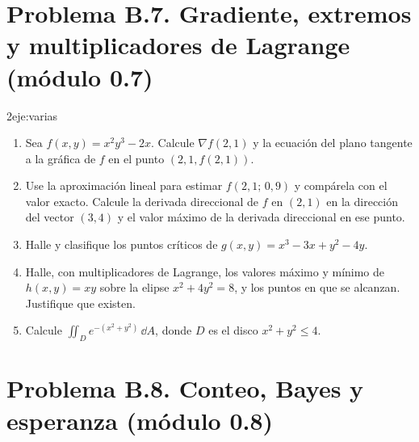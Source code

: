 \section*{Problema B.7. Gradiente, extremos y multiplicadores de Lagrange (módulo 0.7)}

\begin{ejercicio}{2}{eje:varias}
\begin{enumerate}[label=(\alph*)]
  \item {} Sea $f(x,y)=x^{2}y^{3}-2x$. Calcule $\nabla f(2,1)$ y la ecuación del plano tangente a la gráfica de $f$ en el punto $(2,1,f(2,1))$.
  \item {} Use la aproximación lineal para estimar $f(2{,}1;\,0{,}9)$ y compárela con el valor exacto. Calcule la derivada direccional de $f$ en $(2,1)$ en la dirección del vector $(3,4)$ y el valor máximo de la derivada direccional en ese punto.
  \item {} Halle y clasifique los puntos críticos de $g(x,y)=x^{3}-3x+y^{2}-4y$.
  \item {} Halle, con multiplicadores de Lagrange, los valores máximo y mínimo de $h(x,y)=xy$ sobre la elipse $x^{2}+4y^{2}=8$, y los puntos en que se alcanzan. Justifique que existen.
  \item {} Calcule $\displaystyle\iint_{D}e^{-(x^{2}+y^{2})}\,\dd A$, donde $D$ es el disco $x^{2}+y^{2}\le4$.
\end{enumerate}
\end{ejercicio}

\section*{Problema B.8. Conteo, Bayes y esperanza (módulo 0.8)}

